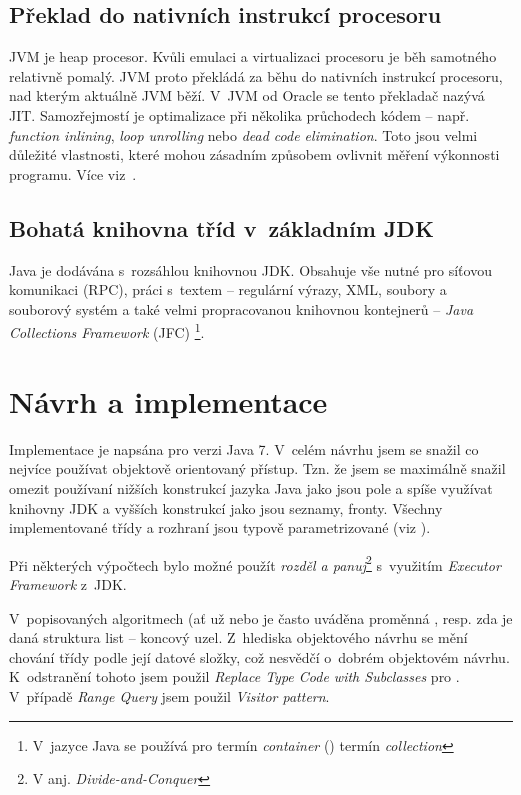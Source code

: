 \subsection{Překlad \bytecode{} do nativních instrukcí procesoru}

JVM je heap procesor.
Kvůli emulaci a virtualizaci procesoru je běh samotného \bytecode{} relativně pomalý.
JVM proto překládá za běhu \bytecode{} do nativních instrukcí procesoru, nad kterým aktuálně JVM běží.
V~JVM od Oracle se tento překladač nazývá JIT\cite{hunt2011java}.
Samozřejmostí je optimalizace při několika průchodech kódem -- např. \emph{function inlining}, \emph{loop unrolling} nebo \emph{dead code elimination}\cite{hunt2011java}.
Toto jsou velmi důležité vlastnosti, které mohou zásadním způsobem ovlivnit měření výkonnosti programu. Více viz~.

\subsection{Bohatá knihovna tříd v~základním JDK}

Java je dodávána s~rozsáhlou knihovnou JDK. Obsahuje vše nutné
pro síťovou komunikaci (RPC), práci s~textem -- regulární výrazy,
XML, soubory a souborový
systém a také velmi propracovanou knihovnou kontejnerů -- \emph{Java
Collections Framework }(JFC)
\footnote{V~jazyce Java se používá pro termín \emph{container} (\CC) termín
\emph{collection}}.

\section{Návrh a implementace}
Implementace  je napsána pro verzi Java 7.
V~celém návrhu jsem se snažil co nejvíce používat objektově orientovaný přístup.
Tzn. že jsem se maximálně snažil omezit používaní nižších konstrukcí jazyka Java jako jsou pole a spíše využívat knihovny JDK a vyšších konstrukcí jako jsou seznamy, fronty.
Všechny implementované třídy a rozhraní jsou typově parametrizované (viz ).

Při některých výpočtech bylo možné použít \emph{rozděl a panuj}\cite{Cormen:2001:IA:580470}\footnote{V anj. \emph{Divide-and-Conquer}} s~využitím \emph{Executor Framework} z~JDK.

V~popisovaných algoritmech (ať už \BPTree{} nebo \MIndex{} je často uváděna proměnná , resp. zda je daná struktura list -- koncový uzel.
Z~hlediska objektového návrhu se mění chování třídy podle její datové složky, což nesvědčí o~dobrém objektovém návrhu.
K~odstranění tohoto jsem použil \emph{Replace Type Code with Subclasses}\cite{fowler1999refactoring} pro \BPTree.
V~případě \MIndex{} \emph{Range Query} jsem použil \emph{Visitor pattern}\cite{gamma1995design}.

